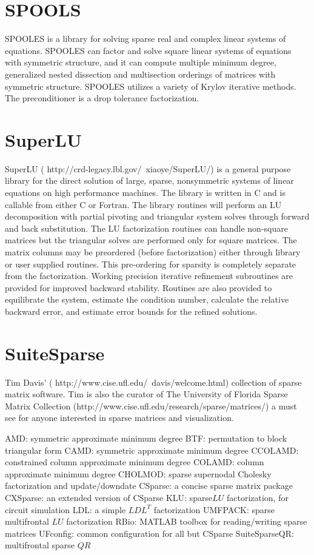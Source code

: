 \section{SPOOLS}
SPOOLES is a library for solving sparse real and complex linear systems of equations. SPOOLES can factor and solve square linear systems of equations with symmetric structure, and it can compute multiple minimum degree, generalized nested dissection and multisection orderings of matrices with symmetric structure.  SPOOLES utilizes a variety of Krylov iterative methods. The preconditioner is a drop tolerance factorization.

\section{SuperLU}
SuperLU ( http://crd-legacy.lbl.gov/~xiaoye/SuperLU/) is a general purpose library for the direct solution of large, sparse, nonsymmetric systems of linear equations on high performance machines. The library is written in C and is callable from either C or Fortran. The library routines will perform an LU decomposition with partial pivoting and triangular system solves through forward and back substitution. The LU factorization routines can handle non-square matrices but the triangular solves are performed only for square matrices. The matrix columns may be preordered (before factorization) either through library or user supplied routines. This pre-ordering for sparsity is completely separate from the factorization. Working precision iterative refinement subroutines are provided for improved backward stability. Routines are also provided to equilibrate the system, estimate the condition number, calculate the relative backward error, and estimate error bounds for the refined solutions.

\section{SuiteSparse}
Tim Davis' ( http://www.cise.ufl.edu/~davis/welcome.html) collection of sparse matrix software.  Tim is also the curator of The University of Florida Sparse Matrix Collection (http://www.cise.ufl.edu/research/sparse/matrices/) a must see for anyone interested in sparse
matrices and visualization.

AMD: symmetric approximate minimum degree
BTF: permutation to block triangular form
CAMD: symmetric approximate minimum degree
CCOLAMD: constrained column approximate minimum degree
COLAMD: column approximate minimum degree
CHOLMOD: sparse supernodal Cholesky factorization and update/downdate
CSparse: a concise sparse matrix package
CXSparse: an extended version of CSparse
KLU: sparse$ LU$ factorization, for circuit simulation
LDL: a simple $LDL^T$ factorization
UMFPACK: sparse multifrontal $LU$ factorization
RBio: MATLAB toolbox for reading/writing sparse matrices
UFconfig: common configuration for all but CSparse
SuiteSparseQR: multifrontal sparse $QR$

